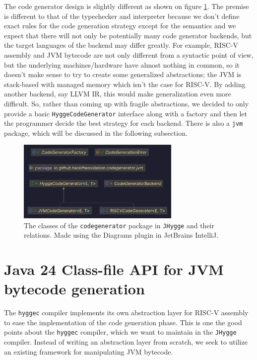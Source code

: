 The code generator design is slightly different as shown on figure \ref{fig:codegenerator_classes}. The premise is different to that of the typechecker and interpreter because we don't define
exact rules for the code generation strategy except for the semantics and we expect that there will not only be potentially many code generator backends,
but the target languages of the backend may differ greatly. For example, RISC-V assembly and JVM bytecode are not only different from a syntactic point
of view, but the underlying machines/hardware have almost nothing in common, so it doesn't make sense to try to create some generalized abstractions;
the JVM is stack-based with managed memory\cite{jvm_spec} which isn't the case for RISC-V. By adding another backend, say LLVM IR, this would make generalization
even more difficult. So, rather than coming up with fragile abstractions, we decided to only provide a basic \texttt{HyggeCodeGenerator} interface
along with a factory and then let the programmer decide the best strategy for each backend. There is also a \texttt{jvm} package, which will be
discussed in the following subsection.

\begin{figure}[H]
\centering
\includegraphics[width=0.7\textwidth]{Pictures/Diagrams/codegenerator_classes.png}
\caption{The classes of the \texttt{codegenerator} package in \texttt{JHygge} and their relations. Made using the Diagrams plugin in JetBrains IntelliJ.}
\label{fig:codegenerator_classes}
\end{figure}

\section{Java 24 Class-file API for JVM bytecode generation}

The \texttt{hyggec} compiler implements its own abstraction layer for RISC-V assembly to ease the implementation of the code
generation phase. This is one the good points about the \texttt{hyggec} compiler, which we want to maintain in the \texttt{JHygge}
compiler. Instead of writing an abstraction layer from scratch, we seek to utilize an existing framework for manipulating JVM
bytecode.

